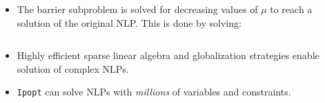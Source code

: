 \begin{frame}[t]
              \begin{footnotesize}
      \begin{itemize}
      \item The barrier subproblem is solved for decreasing values of $\mu$ to reach a solution of the original NLP. This is done by solving:
      \begin{footnotesize}
  \begin{columns}
     \hspace{0.2in} 
        \end{columns}
        \end{footnotesize}
        \vspace{-0.2in}
      \item Highly efficient sparse linear algebra and globalization strategies enable solution of complex NLPs.
      \item {\tt Ipopt} can solve NLPs with {\em millions} of variables and constraints.
      \end{itemize}
      \end{footnotesize}
\end{frame}

